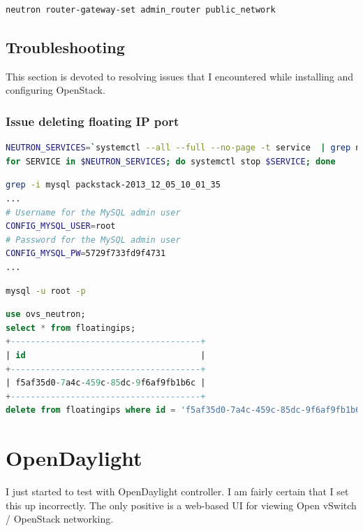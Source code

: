 \documentclass[11pt,letterpaper,oneside]{book}
\begin{document}
\begin{lstlisting}[caption={Set the router gateway},language=bash]
neutron router-gateway-set admin_router public_network
\end{lstlisting}




\subsection{Troubleshooting}
This section is devoted to resolving issues that I encountered while installing and configuring OpenStack.
\subsubsection{Issue deleting floating IP port}
\begin{lstlisting}[caption={Stop Neutron Services},language=bash]
NEUTRON_SERVICES=`systemctl --all --full --no-page -t service  | grep neutron | awk '{print $1}'`
for SERVICE in $NEUTRON_SERVICES; do systemctl stop $SERVICE; done
\end{lstlisting}

\begin{lstlisting}[caption={Find the MariaDB root password},language=bash]
grep -i mysql packstack-2013_12_05_10_01_35 
...
# Username for the MySQL admin user
CONFIG_MYSQL_USER=root
# Password for the MySQL admin user
CONFIG_MYSQL_PW=5729f733fd9f4731
...
\end{lstlisting}
\begin{lstlisting}[caption={Login to MariaDB},language=bash]
mysql -u root -p
\end{lstlisting}
\begin{lstlisting}[caption={Get the ID for the floating IP and delete},language=sql]
use ovs_neutron;
select * from floatingips;
+--------------------------------------+
| id                                   |
+--------------------------------------+
| f5af35d0-7a4c-459c-85dc-9f6af9fb1b6c |
+--------------------------------------+
delete from floatingips where id = 'f5af35d0-7a4c-459c-85dc-9f6af9fb1b6c'
\end{lstlisting}

\section{OpenDaylight}
I just started to test with OpenDaylight controller.  I am fairly certain that I set this up incorrectly.  The only positive is a web-based UI for viewing Open vSwitch / OpenStack networking.
\end{document}

